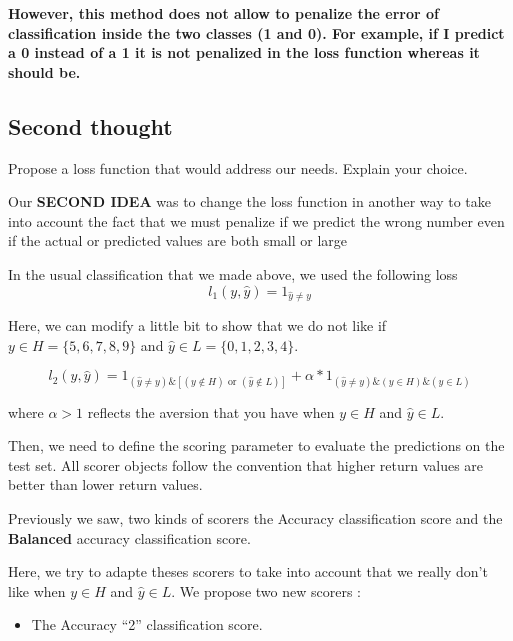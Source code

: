 \documentclass[10pt,a4paper]{article}
\providecommand{\tightlist}{%
  \setlength{\parskip}{0pt}
  }
\theoremstyle{break}
\begin{document}
\textbf{\faArrowCircleRight{} However, this method does not allow to penalize the error of classification inside the two classes (1 and 0). For example, if I predict a 0 instead of a 1 it is not penalized in the loss function whereas it should be.}

\hypertarget{second-thought}{%
\subsection{Second thought}\label{second-thought}}

\begin{tcolorbox}

Propose a loss function that would address our needs. Explain your choice.

\end{tcolorbox}

Our \textbf{SECOND IDEA} was to change the loss function in another way to take into account the fact that we must penalize if we predict the wrong number even if the actual or predicted values are both small or large

In the usual classification that we made above, we used the following loss
\[l_1(y,\hat{y}) = 1_{\hat{y} \ne y}\]

Here, we can modify a little bit to show that we do not like if \(y \in H = \{5, 6, 7, 8, 9\}\) and \(\hat{y} \in L = \{0, 1, 2, 3, 4\}\).

\[
l_2(y,\hat{y}) = 1_{(\hat{y} \ne y) \& [(y \notin H) \text{ or } (\hat{y} \notin L)]} + \alpha * 1_{(\hat{y} \ne y) \& (y \in H) \& (\hat{y} \in L)}
\]

where \(\alpha > 1\) reflects the aversion that you have when \(y \in H\) and \(\hat{y} \in L\).

Then, we need to define the scoring parameter to evaluate the predictions on the test set. All scorer objects follow the convention that higher return values are better than lower return values.

Previously we saw, two kinds of scorers the Accuracy classification score and the \textbf{Balanced} accuracy classification score.

Here, we try to adapte theses scorers to take into account that we really don't like when \(y \in H\) and \(\hat{y} \in L\). We propose two new scorers :

\begin{itemize}
\tightlist
\item
  The Accuracy ``2'' classification score.
\end{itemize}
\end{document}
